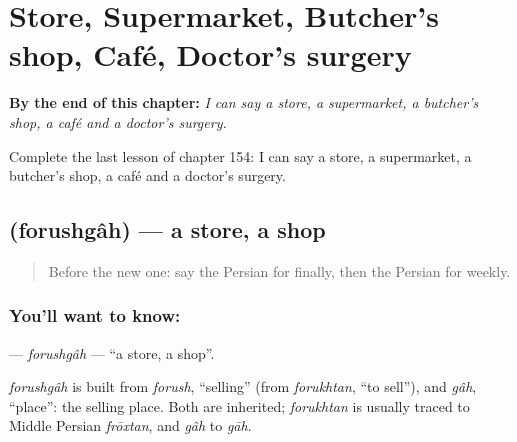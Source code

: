 
\chapter{Store, Supermarket, Butcher's shop, Café, Doctor's surgery}
\label{ch:fa-store-supermarket-butcher-s-shop-cafe-doctor-s-surgery}

\begin{chapteropening}
\textbf{By the end of this chapter:} \emph{I can say a store, a supermarket, a butcher's shop, a café and a doctor's surgery.}

Complete the last lesson of chapter 154: I can say a store, a supermarket, a butcher's shop, a café and a doctor's surgery.
\end{chapteropening}

\section[\texorpdfstring{\fa{فروشگاه} (forushgâh)}{فروشگاه (forushgâh)}]{ (forushgâh) — a store, a shop}

\label{lesson:FA-C154-forushgah}



\begin{quote}
Before the new one: say the Persian for finally, then the Persian for weekly.
\end{quote}

\subsection*{You'll want to know: }
\textbf{} — \emph{forushgâh} — \textquotedblleft{}a store, a shop\textquotedblright{}.

\begin{cousinweb}
\emph{forushgâh} is built from \emph{forush}, \textquotedblleft{}selling\textquotedblright{} (from \emph{forukhtan}, \textquotedblleft{}to sell\textquotedblright{}), and \emph{gâh}, \textquotedblleft{}place\textquotedblright{}: the selling place. Both are inherited; \emph{forukhtan} is usually traced to Middle Persian \emph{frōxtan}, and \emph{gâh} to \emph{gāh}.
\end{cousinweb}

